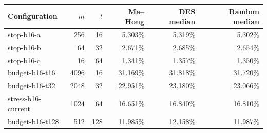 \begin{tabular}{lrrrrr}
\toprule
Configuration & $m$ & $t$ & Ma--Hong & DES median & Random median \\
\midrule
stop-b16-a & 256 & 16 & 5.303\% & 5.319\% & 5.302\% \\
stop-b16-b & 64 & 32 & 2.671\% & 2.685\% & 2.654\% \\
stop-b16-c & 16 & 64 & 1.341\% & 1.357\% & 1.350\% \\
budget-b16-t16 & 4096 & 16 & 31.169\% & 31.818\% & 31.720\% \\
budget-b16-t32 & 2048 & 32 & 22.951\% & 23.180\% & 23.066\% \\
stress-b16-current & 1024 & 64 & 16.651\% & 16.840\% & 16.810\% \\
budget-b16-t128 & 512 & 128 & 11.985\% & 12.158\% & 11.987\% \\
\bottomrule
\end{tabular}
